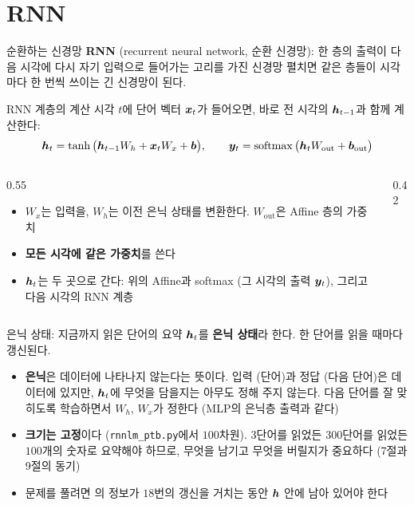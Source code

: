 \documentclass[aspectratio=169,11pt]{beamer}
\begin{document}
\section{RNN}

\begin{frame}{순환하는 신경망}
\textbf{RNN} (recurrent neural network, 순환 신경망):
한 층의 출력이 다음 시각에 다시 자기 입력으로 들어가는 고리를 가진 신경망
\vskip1mm
펼치면 같은 층들이 시각마다 한 번씩 쓰이는 긴 신경망이 된다.
\end{frame}

\begin{frame}{RNN 계층의 계산}
시각 $t$에 단어 벡터 $\bm{x}_t$가 들어오면, 바로 전 시각의 $\bm{h}_{t-1}$과 함께 계산한다:
\[
\bm{h}_t=\tanh\big(\bm{h}_{t-1}W_h+\bm{x}_tW_x+\bm{b}\big),\qquad
\bm{y}_t=\operatorname{softmax}\big(\bm{h}_tW_{\text{out}}+\bm{b}_{\text{out}}\big)
\]
\begin{columns}[c,onlytextwidth]
\begin{column}{0.55\textwidth}
\begin{itemize}
\item $W_x$는 입력을, $W_h$는 이전 은닉 상태를 변환한다.
$W_{\text{out}}$은 Affine 층의 가중치
\item \textbf{모든 시각에 같은 가중치}를 쓴다
\item $\bm{h}_t$는 두 곳으로 간다: 위의 Affine과 softmax (그 시각의 출력 $\bm{y}_t$),
그리고 다음 시각의 RNN 계층
\end{itemize}
\end{column}
\begin{column}{0.42\textwidth}
\end{column}
\end{columns}
\end{frame}

\begin{frame}{은닉 상태: 지금까지 읽은 단어의 요약}
$\bm{h}_t$를 \textbf{은닉 상태}라 한다. 한 단어를 읽을 때마다 갱신된다.
\vskip1mm
\begin{itemize}
\item \textbf{은닉}은 데이터에 나타나지 않는다는 뜻이다.
입력 (단어)과 정답 (다음 단어)은 데이터에 있지만, $\bm{h}_t$에 무엇을 담을지는 아무도 정해 주지 않는다.
다음 단어를 잘 맞히도록 학습하면서 $W_h$, $W_x$가 정한다 (MLP의 은닉층 출력과 같다)
\item \textbf{크기는 고정}이다 (\texttt{rnnlm\_ptb.py}에서 $100$차원).
$3$단어를 읽었든 $300$단어를 읽었든 $100$개의 숫자로 요약해야 하므로,
무엇을 남기고 무엇을 버릴지가 중요하다 (7절과 9절의 동기)
\item {} 문제를 풀려면 의 정보가 $18$번의 갱신을 거치는 동안
$\bm{h}$ 안에 남아 있어야 한다
\end{itemize}
\end{frame}
\end{document}
